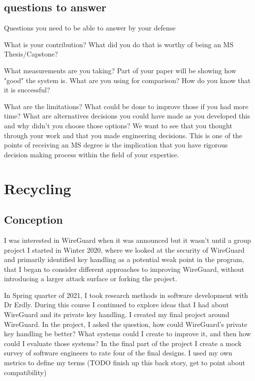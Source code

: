 \documentclass [11pt, proquest] {uwthesis}[2020/02/24]
\begin{document}
\subsection{questions to answer}
Questions you need to be able to answer by your defense

    What is your contribution? What did you do that is worthy of being an MS Thesis/Capstone?

    What measurements are you taking? Part of your paper will be showing how "good" the system is. What are you using for comparison? How do you know that it is successful?

    What are the limitations? What could be done to improve those if you had more time? 
    What are alternatives decisions you could have made as you developed this and why didn't you choose those options? 
    We want to see that you thought through your work and that you made engineering decisions. 
        This is one of the points of receiving an MS degree is the implication that you have rigorous decision making process within the field of your expertise.
        
\section{Recycling}

\subsection {Conception}
I was interested in WireGuard when it was announced but it wasn't until a group project I started in Winter 2020, where we looked at the security of WireGuard and primarily identified key handling as a potential weak point in the program, that I began to consider different approaches to improving WireGuard,  without introducing a larger attack surface or forking the project. 

In Spring quarter of 2021, I took research methods in software development with Dr Erdly. During this course I continued to explore ideas that I had about WireGuard and its private key handling. I created my final project around WireGuard. In the project, I asked the question, how could WireGuard's private key handling be better? What systems could I create to improve it, and then how could I evaluate those systems?  
In the final part of the project I create a mock survey of software engineers to rate four of the final designs. I used my own metrics to define my terms (TODO finish up this back story, get to point about compatibility)
\end{document}
